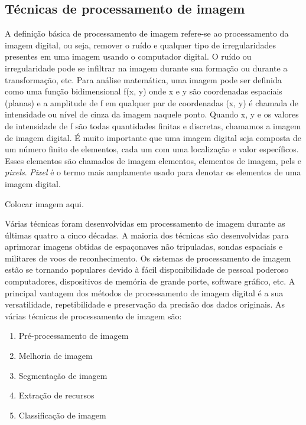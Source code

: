 


\subsection{Técnicas de processamento de imagem}
A definição básica de processamento de imagem refere-se ao processamento da imagem digital, ou seja, remover o ruído e qualquer tipo de irregularidades presentes em uma imagem usando o computador digital. O ruído ou irregularidade pode se infiltrar na imagem durante sua formação ou durante a transformação, etc. Para análise matemática, uma imagem pode ser definida como uma função bidimensional f(x, y) onde x e y são coordenadas espaciais (planas) e a amplitude de f em qualquer par de coordenadas (x, y) é chamada de intensidade ou nível de cinza da imagem naquele ponto. Quando x, y e os valores de intensidade de f são todas quantidades finitas e discretas, chamamos a imagem de imagem digital. É muito importante que uma imagem digital seja composta de um número finito de elementos, cada um com uma localização e valor específicos. Esses elementos são chamados de imagem elementos, elementos de imagem, pels e \textit{pixels}. \textit{Pixel} é o termo mais amplamente usado para denotar os elementos de uma imagem digital.

Colocar imagem aqui.

Várias técnicas foram desenvolvidas em processamento de imagem durante as últimas quatro a cinco décadas. A maioria dos técnicas são desenvolvidas para aprimorar imagens obtidas de espaçonaves não tripuladas, sondas espaciais e militares de voos de reconhecimento. Os sistemas de processamento de imagem estão se tornando populares devido à fácil disponibilidade de pessoal poderoso computadores, dispositivos de memória de grande porte, software gráfico, etc. A principal vantagem dos métodos de processamento de imagem digital é a sua versatilidade, repetibilidade e preservação da precisão dos dados originais. As várias técnicas de processamento de imagem são:

\begin{enumerate}
        \item Pré-processamento de imagem
        \item Melhoria de imagem
        \item Segmentação de imagem
        \item Extração de recursos
        \item Classificação de imagem
\end{enumerate}

